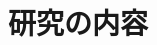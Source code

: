 \documentclass[dvipdfmx,cjk,xcolor=dvipsnames,envcountsect,notheorems,12pt]{beamer}
\theoremstyle{definition}
\begin{document}
\section{研究の内容}






\end{document}
